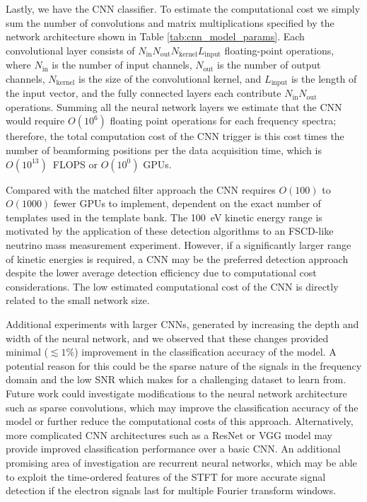 Lastly, we have the CNN classifier. To estimate the computational cost we simply sum the number of convolutions and matrix multiplications specified by the network architecture shown in Table \ref{tab:cnn_model_params}. Each convolutional layer consists of $N_\mathrm{in}N_\mathrm{out}N_\mathrm{kernel}L_\mathrm{input}$ floating-point operations, where $N_\mathrm{in}$ is the number of input channels, $N_\mathrm{out}$ is the number of output channels, $N_\mathrm{kernel}$ is the size of the convolutional kernel, and $L_\mathrm{input}$ is the length of the input vector, and the fully connected layers each contribute $N_\mathrm{in}N_\mathrm{out}$ operations. Summing all the neural network layers we estimate that the CNN would require $O(10^6)$ floating point operations for each frequency spectra; therefore, the total computation cost of the CNN trigger is this cost times the number of beamforming positions per the data acquisition time, which is $O(10^{13})$~FLOPS or $O(10^0)$ GPUs.

Compared with the matched filter approach the CNN requires $O(100)$ to $O(1000)$ fewer GPUs to implement, dependent on the exact number of templates used in the template bank. The 100~eV kinetic energy range is motivated by the application of these detection algorithms to an FSCD-like neutrino mass measurement experiment. However, if a significantly larger range of kinetic energies is required, a CNN may be the preferred detection approach despite the lower average detection efficiency due to computational cost considerations. The low estimated computational cost of the CNN is directly related to the small network size.


Additional experiments with larger CNNs, generated by increasing the depth and width of the neural network, and we observed that these changes provided minimal ($\lesssim 1\%$) improvement in the classification accuracy of the model. A potential reason for this could be the sparse nature of the signals in the frequency domain and the low SNR which makes for a challenging dataset to learn from. Future work could investigate modifications to the neural network architecture such as sparse convolutions, which may improve the classification accuracy of the model or further reduce the computational costs of this approach. Alternatively, more complicated CNN architectures such as a ResNet \cite{resnet} or VGG model \cite{vgg} may provide improved classification performance over a basic CNN. An additional promising area of investigation are recurrent neural networks, which may be able to exploit the time-ordered features of the STFT for more accurate signal detection if the electron signals last for multiple Fourier transform windows.

